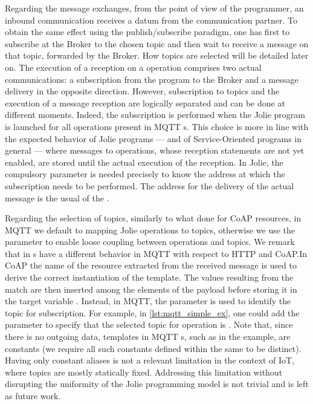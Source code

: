 Regarding the message exchanges, from the point of view of the programmer, an
inbound  communication receives a datum from the communication
partner. To obtain the same effect using the publish/subscribe paradigm, one has
first to subscribe at the Broker to the chosen topic and then wait to receive a
message on that topic, forwarded by the Broker. How topics are selected will be
detailed later on. The execution of a reception on a  operation
comprises two actual communications: a subscription from the program to the
Broker and a message delivery in the opposite direction. However, subscription
to topics and the execution of a message reception are logically separated and
can be done at different moments. Indeed, the subscription is performed when the
Jolie program is launched for all operations present in MQTT
s. This choice is more in line with the expected behavior of
Jolie programs --- and of Service-Oriented programs in general --- where
messages to operations, whose reception statements are not yet enabled, are
stored until the actual execution of the reception.
%
%
In Jolie, the compulsory parameter  is needed precisely to know
the address at which the subscription needs to be performed. The address for the
delivery of the actual message is the usual  of the
.

Regarding the selection of topics, similarly to what done for CoAP resources, in
MQTT we default to mapping Jolie operations to topics, otherwise we use the
 parameter  to enable loose coupling between operations
and topics. We remark that  in s have a different
behavior in MQTT with respect to HTTP and CoAP.\@ In CoAP the name of the resource extracted
from the received message is used to derive the correct instantiation of the
 template. The values resulting from the match are then
inserted among the elements of the payload before storing it in the target
variable . Instead, in MQTT, the  parameter is used to
identify the topic for subscription. For example, in \cref{lst:mqtt_simple_ex},
one could add the  parameter  to specify that the selected topic for operation
 is . Note that, since
there is no outgoing data, templates in MQTT s, such as
 in the example, are constants (we require all such
constants defined within the same
 to be distinct). Having only constant aliases is not a relevant
limitation in the context of IoT, where topics are mostly statically fixed.
Addressing this limitation without disrupting the uniformity of the Jolie
programming model is not trivial and is left as future work.

